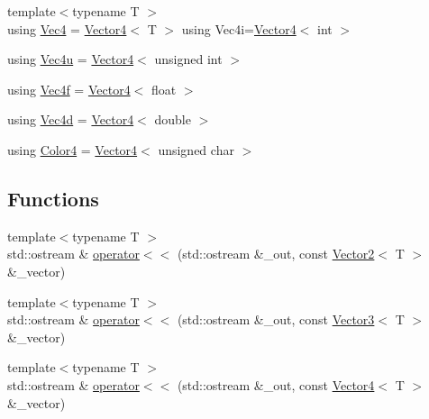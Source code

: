 \begin{DoxyCompactItemize}
\item 
{\footnotesize template$<$typename T $>$ }\\using \mbox{\hyperlink{namespacepad_1_1math_a60dc33698b324ca795bfef17a678b368}{Vec4}} = \mbox{\hyperlink{structpad_1_1math_1_1_vector4}{Vector4}}$<$ T $>$ using Vec4i=\mbox{\hyperlink{structpad_1_1math_1_1_vector4}{Vector4}}$<$ int $>$
\item 
using \mbox{\hyperlink{namespacepad_1_1math_ad5b8d7d51edf8173f6a0ddbbb792c803}{Vec4u}} = \mbox{\hyperlink{structpad_1_1math_1_1_vector4}{Vector4}}$<$ unsigned int $>$
\item 
using \mbox{\hyperlink{namespacepad_1_1math_a4eb77014ac7b74bd24cf73bca82ac3a3}{Vec4f}} = \mbox{\hyperlink{structpad_1_1math_1_1_vector4}{Vector4}}$<$ float $>$
\item 
using \mbox{\hyperlink{namespacepad_1_1math_a845efb6de5d2237d1a7f27cf87741454}{Vec4d}} = \mbox{\hyperlink{structpad_1_1math_1_1_vector4}{Vector4}}$<$ double $>$
\item 
using \mbox{\hyperlink{namespacepad_1_1math_af6a050aafcf279514a0beada2fb7a173}{Color4}} = \mbox{\hyperlink{structpad_1_1math_1_1_vector4}{Vector4}}$<$ unsigned char $>$
\end{DoxyCompactItemize}
\subsection*{Functions}
\begin{DoxyCompactItemize}
\item 
{\footnotesize template$<$typename T $>$ }\\std\+::ostream \& \mbox{\hyperlink{namespacepad_1_1math_aef2c4cef650688967cb74c75c5d4aafa}{operator$<$$<$}} (std\+::ostream \&\+\_\+out, const \mbox{\hyperlink{structpad_1_1math_1_1_vector2}{Vector2}}$<$ T $>$ \&\+\_\+vector)
\item 
{\footnotesize template$<$typename T $>$ }\\std\+::ostream \& \mbox{\hyperlink{namespacepad_1_1math_a9e468612d54c187ec0eaac48e304e673}{operator$<$$<$}} (std\+::ostream \&\+\_\+out, const \mbox{\hyperlink{structpad_1_1math_1_1_vector3}{Vector3}}$<$ T $>$ \&\+\_\+vector)
\item 
{\footnotesize template$<$typename T $>$ }\\std\+::ostream \& \mbox{\hyperlink{namespacepad_1_1math_aea739f95f7147095cec34ccedee7eea2}{operator$<$$<$}} (std\+::ostream \&\+\_\+out, const \mbox{\hyperlink{structpad_1_1math_1_1_vector4}{Vector4}}$<$ T $>$ \&\+\_\+vector)
\end{DoxyCompactItemize}


